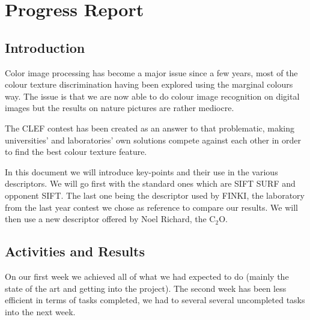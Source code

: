 \documentclass[12pt]{article}
\begin{document}
\section*{Progress Report}

\subsection*{Introduction}
Color image processing has become a major issue since a few years, most of the colour texture discrimination having been explored using the marginal colours way. The issue is that we are now able to do colour image recognition on digital images but the results on nature pictures are rather mediocre.

The CLEF contest has been created as an answer to that problematic, making universities' and laboratories' own solutions compete against each other in order to find the best colour texture feature.

In this document we will introduce key-points and their use in the various descriptors. We will go first with the standard ones which are SIFT SURF and opponent SIFT. The last one being the descriptor used by FINKI, the laboratory from the last year contest we chose as reference to compare our results. We will then use a new descriptor offered by Noel Richard, the C$_2$O.

\subsection*{Activities and Results}
On our first week we achieved all of what we had expected to do (mainly the state of the art and getting into the project).
The second week has been less efficient in terms of tasks completed, we had to several several uncompleted tasks into the next week.
\end{document}
